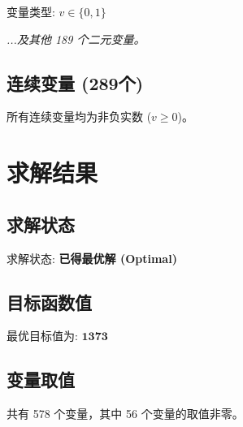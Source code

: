 \documentclass[a4paper,10pt]{article}
\begin{document}
变量类型: $v \in \{0,1\}$

\textit{...及其他 189 个二元变量。}

\subsection{连续变量 (289个)}

所有连续变量均为非负实数 ($v \geq 0$)。

\section{求解结果}

\subsection{求解状态}

求解状态: \textbf{已得最优解 (Optimal)}

\subsection{目标函数值}

最优目标值为: $\mathbf{1373}$

\subsection{变量取值}

共有 578 个变量，其中 56 个变量的取值非零。
\end{document}
